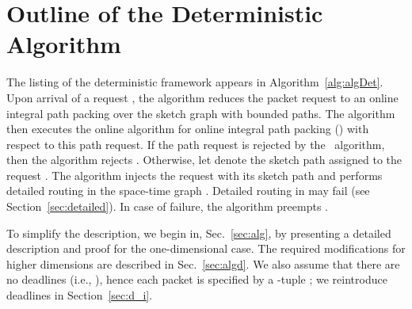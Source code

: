 \documentclass[11pt]{article}
\newcommand{\route}{\text{\sc{ipp}}}
\newcommand{\IPP}{\route}
\newenvironment{proof sketch}[1]{\noindent {\emph{Proof sketch of #1:}}}{\hfill \qed}
\begin{document}
\begin{comment}
  \item Using the same technique, one can prove that  for
  .
\end{comment}


\section{Outline of the Deterministic Algorithm}\label{sec:outline}
The listing of the deterministic framework appears in
Algorithm~\ref{alg:algDet}.  Upon arrival of a request , the
algorithm reduces the packet request to an online integral path
packing over the sketch graph with bounded paths. The algorithm then
executes the online algorithm for online integral path packing (\IPP)
with respect to this path request. If the path request is rejected by
the \IPP\ algorithm, then the algorithm rejects .  Otherwise, let
 denote the sketch path assigned to the request . The
algorithm injects the request  with its sketch path 
and performs detailed routing in the space-time graph .
Detailed routing in  may fail (see
Section~\ref{sec:detailed}). In case of failure, the algorithm
preempts .


To simplify the description, we begin in, Sec.~\ref{sec:alg}, by
presenting a detailed description and proof for the one-dimensional
case.  The required modifications for higher dimensions are described
in Sec.~\ref{sec:algd}.  We also assume that there are no deadlines
(i.e., ), hence each packet is specified by a -tuple
; we reintroduce deadlines in
Section~\ref{sec:d_i}.
\end{document}
